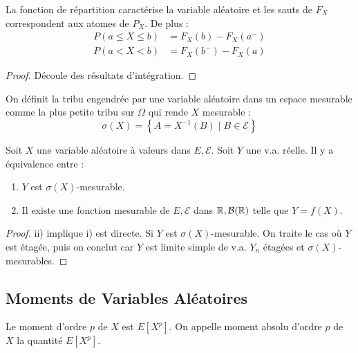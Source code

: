 \documentclass{cours}
\begin{document}
    \begin{proposition}
        La fonction de répartition caractérise la variable aléatoire et les sauts de $F_{X}$ correspondent aux atomes de $P_{X}$. De plus : 
        \[
            \begin{aligned}
                P\left(a \leq X \leq b\right) &= F_{X}(b) - F_{X}(a^{-})\\
                P\left(a < X < b\right) &= F_{X}(b^{-}) - F_{X}(a)
            \end{aligned}    
        \]
    \end{proposition}
    \begin{proof}
        Découle des résultats d'intégration.
    \end{proof}

    \begin{definition}
        On définit la tribu engendrée par une variable aléatoire dans un espace mesurable comme la plus petite tribu sur $\Omega$ qui rende $X$ mesurable : 
        \[
            \sigma(X) = \left\{A = X^{-1}(B)\mid B\in \mathcal{E}\right\}    
        \]
    \end{definition}

    \begin{proposition}
        Soit $X$ une variable aléatoire à valeurs dans $E, \mathcal{E}$. Soit $Y$ une v.a. réelle. Il y a équivalence entre :
        \begin{enumerate}
            \item $Y$ est $\sigma(X)$-mesurable. 
            \item Il existe une fonction mesurable de $E, \mathcal{E}$ dans $\mathbb{R}, \mathcal{B}(\mathbb{R})$ telle que $Y = f(X)$.
        \end{enumerate}
    \end{proposition}
    \begin{proof}
        ii) implique i) est directe. Si $Y$ est $\sigma(X)$-mesurable. On traite le cas où $Y$ est étagée, puis on conclut car $Y$ est limite simple de v.a. $Y_{n}$ étagées et $\sigma(X)$-mesurables.
    \end{proof}

    \subsection{Moments de Variables Aléatoires}
    \begin{definition}
        Le moment d'ordre $p$ de $X$ est $E[X^{p}]$. On appelle moment absolu d'ordre $p$ de $X$ la quantité $E\left[X^{p}\right]$.
    \end{definition}
\end{document}
